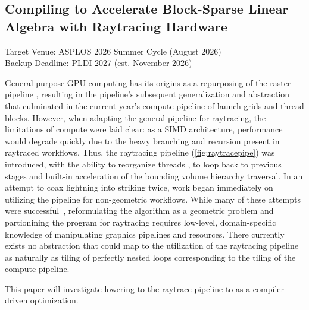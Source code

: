 \documentclass[review, acmsmall, nonacm]{acmart}
\begin{document}
\subsection{Compiling to Accelerate Block-Sparse Linear Algebra with Raytracing Hardware}

Target Venue: ASPLOS 2026 Summer Cycle (August 2026) \\
Backup Deadline: PLDI 2027 (est. November 2026)

General purpose GPU computing has its origins as a repurposing of the raster pipeline \cite{bolzSparseMatrixSolvers2003,krugerLinearAlgebraOperators2003}, resulting in the pipeline's subsequent generalization and abstraction that culminated in the current year's compute pipeline of launch grids and thread blocks. However, when adapting the general pipeline for raytracing, the limitations of compute were laid clear: as a SIMD architecture, performance would degrade quickly due to the heavy branching and recursion present in raytraced workflows. Thus, the raytracing pipeline (\autoref{fig:raytracepipe}) was introduced, with the ability to reorganize threads \cite{adinetCUDADynamicParallelism2014}, to loop back to previous stages and built-in acceleration of the bounding volume hierarchy traversal. In an attempt to coax lightning into striking twice, work began immediately on utilizing the pipeline for non-geometric workflows. While many of these attempts were successful~\cite{menesesAcceleratingRangeMinimum2024,bauerVisibilityAlgorithmsDynamic2023,haGeneralizingRayTracing2024,Evangelou2021RadiusSearch,hennebergRTIndeXExploitingHardwareAccelerated2023}, reformulating the algorithm as a geometric problem and partionining the program for raytracing requires low-level, domain-specific knowledge of manipulating graphics pipelines and resources. There currently exists no abstraction that could map to the utilization of the raytracing pipeline as naturally as tiling of perfectly nested loops corresponding to the tiling of the compute pipeline.

This paper will investigate lowering to the raytrace pipeline to as a compiler-driven optimization.
\end{document}
